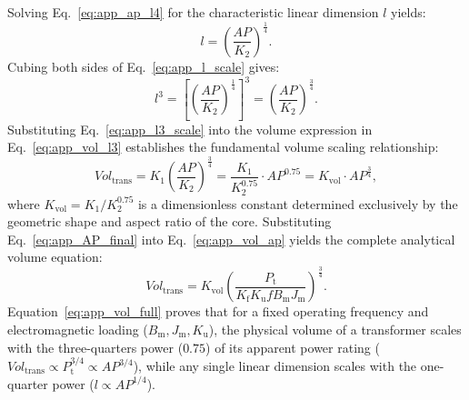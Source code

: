 Solving Eq.~\ref{eq:app_ap_l4} for the characteristic linear dimension $l$ yields:
\begin{equation}
    l = \left( \frac{AP}{K_2} \right)^{\frac{1}{4}}. \label{eq:app_l_scale}
\end{equation}
Cubing both sides of Eq.~\ref{eq:app_l_scale} gives:
\begin{equation}
    l^3 = \left[ \left( \frac{AP}{K_2} \right)^{\frac{1}{4}} \right]^3 = \left( \frac{AP}{K_2} \right)^{\frac{3}{4}}. \label{eq:app_l3_scale}
\end{equation}
Substituting Eq.~\ref{eq:app_l3_scale} into the volume expression in Eq.~\ref{eq:app_vol_l3} establishes the fundamental volume scaling relationship:
\begin{equation}
    Vol_{\mathrm{trans}} = K_1 \left( \frac{AP}{K_2} \right)^{\frac{3}{4}} = \frac{K_1}{K_2^{0.75}} \cdot AP^{0.75} = K_{\mathrm{vol}} \cdot AP^{\frac{3}{4}}, \label{eq:app_vol_ap}
\end{equation}
where $K_{\mathrm{vol}} = K_1 / K_2^{0.75}$ is a dimensionless constant determined exclusively by the geometric shape and aspect ratio of the core. Substituting Eq.~\ref{eq:app_AP_final} into Eq.~\ref{eq:app_vol_ap} yields the complete analytical volume equation:
\begin{equation}
    Vol_{\mathrm{trans}} = K_{\mathrm{vol}} \left( \frac{P_{\mathrm{t}}}{K_{\mathrm{f}} K_{\mathrm{u}} f B_{\mathrm{m}} J_{\mathrm{m}}} \right)^{\frac{3}{4}}. \label{eq:app_vol_full}
\end{equation}
Equation~\ref{eq:app_vol_full} proves that for a fixed operating frequency and electromagnetic loading ($B_{\mathrm{m}}, J_{\mathrm{m}}, K_{\mathrm{u}}$), the physical volume of a transformer scales with the three-quarters power ($0.75$) of its apparent power rating ($Vol_{\mathrm{trans}} \propto P_{\mathrm{t}}^{3/4} \propto AP^{3/4}$), while any single linear dimension scales with the one-quarter power ($l \propto AP^{1/4}$).